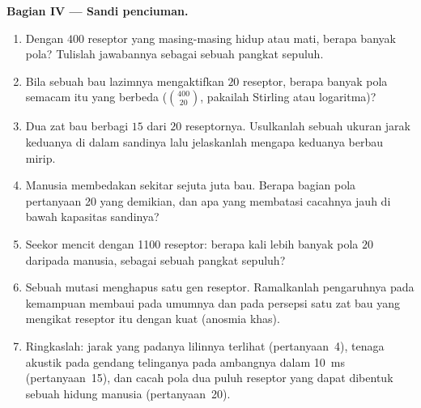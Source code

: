 \begin{problem}
\medskip
\noindent\textbf{Bagian IV --- Sandi penciuman.}
\begin{enumerate}[resume]
  \item Dengan $400$ reseptor yang masing-masing hidup atau mati, berapa banyak pola? Tulislah
        jawabannya sebagai sebuah pangkat sepuluh.
  \item Bila sebuah bau lazimnya mengaktifkan $20$ reseptor, berapa banyak
        pola semacam itu yang berbeda ($\binom{400}{20}$, pakailah
        Stirling atau logaritma)?
  \item Dua zat bau berbagi $15$ dari $20$ reseptornya. Usulkanlah sebuah
        ukuran jarak keduanya di dalam sandinya lalu jelaskanlah mengapa keduanya
        berbau mirip.
  \item Manusia membedakan sekitar sejuta juta bau. Berapa bagian
        pola pertanyaan 20 yang demikian, dan apa yang membatasi cacahnya
        jauh di bawah kapasitas sandinya?
  \item Seekor mencit dengan \num{1100} reseptor: berapa kali lebih banyak pola
        $20$ daripada manusia, sebagai sebuah pangkat sepuluh?
  \item Sebuah mutasi menghapus satu gen reseptor. Ramalkanlah pengaruhnya pada
        kemampuan membaui pada umumnya dan pada persepsi satu
        zat bau yang mengikat reseptor itu dengan kuat (anosmia khas).
  \item Ringkaslah: jarak yang padanya lilinnya terlihat
        (pertanyaan~4), tenaga akustik pada gendang telinganya pada ambangnya
        dalam \qty{10}{ms} (pertanyaan~15), dan cacah pola dua puluh reseptor
        yang dapat dibentuk sebuah hidung manusia (pertanyaan~20).
\end{enumerate}
\end{problem}
